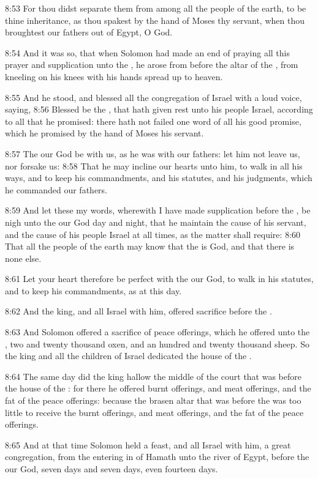 8:53 For thou didst separate them from among all the people of the
earth, to be thine inheritance, as thou spakest by the hand of Moses
thy servant, when thou broughtest our fathers out of Egypt, O \LORD
God.

8:54 And it was so, that when Solomon had made an end of praying all
this prayer and supplication unto the \LORD, he arose from before the
altar of the \LORD, from kneeling on his knees with his hands spread up
to heaven.

8:55 And he stood, and blessed all the congregation of Israel with a
loud voice, saying, 8:56 Blessed be the \LORD, that hath given rest
unto his people Israel, according to all that he promised: there hath
not failed one word of all his good promise, which he promised by the
hand of Moses his servant.

8:57 The \LORD our God be with us, as he was with our fathers: let him
not leave us, nor forsake us: 8:58 That he may incline our hearts unto
him, to walk in all his ways, and to keep his commandments, and his
statutes, and his judgments, which he commanded our fathers.

8:59 And let these my words, wherewith I have made supplication before
the \LORD, be nigh unto the \LORD our God day and night, that he
maintain the cause of his servant, and the cause of his people Israel
at all times, as the matter shall require: 8:60 That all the people of
the earth may know that the \LORD is God, and that there is none else.

8:61 Let your heart therefore be perfect with the \LORD our God, to
walk in his statutes, and to keep his commandments, as at this day.

8:62 And the king, and all Israel with him, offered sacrifice before
the \LORD.

8:63 And Solomon offered a sacrifice of peace offerings, which he
offered unto the \LORD, two and twenty thousand oxen, and an hundred
and twenty thousand sheep. So the king and all the children of Israel
dedicated the house of the \LORD.

8:64 The same day did the king hallow the middle of the court that was
before the house of the \LORD: for there he offered burnt offerings,
and meat offerings, and the fat of the peace offerings: because the
brasen altar that was before the \LORD was too little to receive the
burnt offerings, and meat offerings, and the fat of the peace
offerings.

8:65 And at that time Solomon held a feast, and all Israel with him, a
great congregation, from the entering in of Hamath unto the river of
Egypt, before the \LORD our God, seven days and seven days, even
fourteen days.

